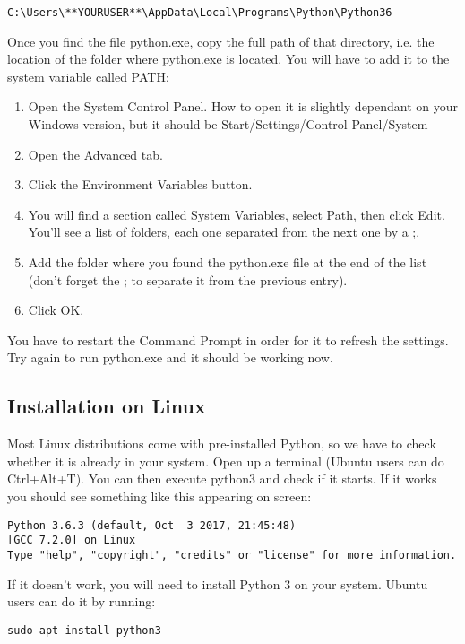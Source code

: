 \begin{verbatim}
C:\Users\**YOURUSER**\AppData\Local\Programs\Python\Python36
\end{verbatim}

Once you find the file python.exe, copy the full path of that directory, i.e. the location of the folder where python.exe is located. You will have to add it to the system variable called PATH:

\begin{enumerate}
 \item Open the System Control Panel. How to open it is slightly dependant on your Windows version, but it should be Start/Settings/Control Panel/System
 \item Open the Advanced tab.
 \item Click the Environment Variables button.
 \item You will find a section called System Variables, select Path, then click Edit. You’ll see a list of folders, each one separated from the next one by a ;.
 \item Add the folder where you found the python.exe file at the end of the list (don’t forget the ; to separate it from the previous entry). \item Click OK.
\end{enumerate}

You have to restart the Command Prompt in order for it to refresh the settings. Try again to run python.exe and it should be working now.

\subsection{Installation on Linux}
Most Linux distributions come with pre-installed Python, so we have to check whether it is already in your system. Open up a terminal (Ubuntu users can do Ctrl+Alt+T). You can then execute python3 and check if it starts. If it works you should see something like this appearing on screen:

\begin{verbatim}
Python 3.6.3 (default, Oct  3 2017, 21:45:48)
[GCC 7.2.0] on Linux
Type "help", "copyright", "credits" or "license" for more information.
\end{verbatim}

If it doesn’t work, you will need to install Python 3 on your system. Ubuntu users can do it by running:
\begin{verbatim}
sudo apt install python3
\end{verbatim}

